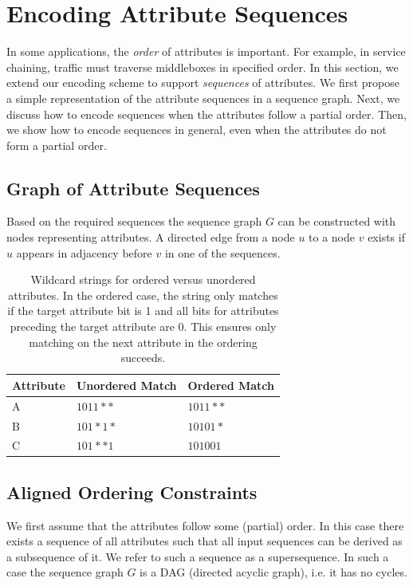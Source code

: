 \section{Encoding Attribute Sequences}
\label{sec:ordering}
In some applications, the \emph{order} of attributes is important.  For example, in service chaining, traffic must traverse middleboxes in specified order.  In this section, we extend our encoding scheme to support \textit{sequences} of attributes.  We first propose a simple representation of the attribute sequences in a sequence graph.  Next, we discuss how to encode sequences when the attributes follow a partial order.  Then, we show how to encode sequences in general, even when the attributes do not form a partial order.

\subsection{Graph of Attribute Sequences}
Based on the required sequences the sequence graph $G$ can be constructed with nodes representing attributes. A directed edge from a node $u$ to a node $v$ exists if $u$ appears in adjacency before $v$ in one of the sequences.  

\begin{table}
    \begin{tabular}{| l | l | l |}
    \hline
    Attribute & Unordered Match & Ordered Match\\ \hline
    A & $1011**$ & $1011**$ \\ \hline
    B & $101*1*$ & $10101*$ \\ \hline
    C & $101**1$ & $101001$ \\
    \hline
    \end{tabular}
    \caption{Wildcard strings for ordered versus unordered attributes. %
     In the ordered case, the string only matches if the target attribute bit is 1 and all bits for attributes preceding the target attribute are 0. This ensures only matching on the next attribute in the ordering succeeds.} 
    \label{tab:ordering}
\end{table}

\subsection{Aligned Ordering Constraints}
We first assume that the attributes follow some (partial) order. In this case there exists a sequence of all attributes such that all input sequences can be derived as a subsequence of it. 
We refer to such a sequence as a supersequence. 
In such a case the sequence graph $G$ is a DAG (directed acyclic graph), i.e. it has no cycles.

